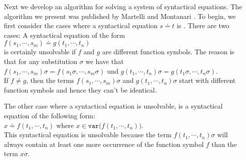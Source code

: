 Next we develop an algorithm for solving a system of syntactical equations.
The algorithm we present was published by Martelli and Montanari
\cite{martelli:1982}.  
To begin, we first consider the cases where a syntactical equation $s \doteq t$ is .
There are two cases: A syntactical equation of the form
\\[0.2cm]
\hspace*{1.3cm}
$f(s_1,\cdots,s_m) \doteq g(t_1,\cdots, t_n)$ \\[0.2cm]
is certainly unsolvable if  $f$ and $g$ are different function symbols. The reason is that for any substitution
$\sigma$ we have that \\[0.2cm]
\hspace*{1.0cm} $f(s_1,\cdots,s_m)\sigma = f(s_1\sigma,\cdots,s_m\sigma)$ \quad und \quad
                $g(t_1,\cdots, t_n)\sigma = g(t_1\sigma,\cdots,t_n\sigma)$. \\[0.2cm]
If $f \not = g$, then the terms  $f(s_1,\cdots,s_m)\sigma$ and $g(t_1,\cdots, t_n)\sigma$ start with different
function symbols and hence they can't be identical.

The other case where a syntactical equation is unsolvable, is a syntactical equation of the following form:
\\[0.2cm]
\hspace*{1.3cm}
$x \doteq f(t_1,\cdots,t_n)$  \quad where $x \in \texttt{var}\big(f(t_1,\cdots,t_n)\big)$.
\\[0.2cm]
This syntactical equation is unsolvable because the term $f(t_1,\cdots,t_n)\sigma$ will always contain at least one more
occurrence of the function symbol $f$ than the term $x\sigma$.

